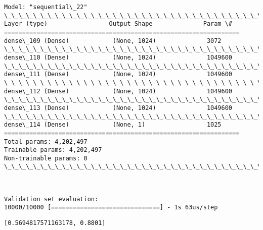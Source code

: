 \documentclass[11pt]{article}
\makeatletter
\newcommand{\boxspacing}{\kern\kvtcb@left@rule\kern\kvtcb@boxsep}
\newcommand{\prompt}[4]{
        \ttfamily\llap{{\color{#2}[#3]:\hspace{3pt}#4}}\vspace{-\baselineskip}
    }
\makeatother
\begin{document}
    \begin{Verbatim}[commandchars=\\\{\}]
Model: "sequential\_22"
\_\_\_\_\_\_\_\_\_\_\_\_\_\_\_\_\_\_\_\_\_\_\_\_\_\_\_\_\_\_\_\_\_\_\_\_\_\_\_\_\_\_\_\_\_\_\_\_\_\_\_\_\_\_\_\_\_\_\_\_\_\_\_\_\_
Layer (type)                 Output Shape              Param \#
=================================================================
dense\_109 (Dense)            (None, 1024)              3072
\_\_\_\_\_\_\_\_\_\_\_\_\_\_\_\_\_\_\_\_\_\_\_\_\_\_\_\_\_\_\_\_\_\_\_\_\_\_\_\_\_\_\_\_\_\_\_\_\_\_\_\_\_\_\_\_\_\_\_\_\_\_\_\_\_
dense\_110 (Dense)            (None, 1024)              1049600
\_\_\_\_\_\_\_\_\_\_\_\_\_\_\_\_\_\_\_\_\_\_\_\_\_\_\_\_\_\_\_\_\_\_\_\_\_\_\_\_\_\_\_\_\_\_\_\_\_\_\_\_\_\_\_\_\_\_\_\_\_\_\_\_\_
dense\_111 (Dense)            (None, 1024)              1049600
\_\_\_\_\_\_\_\_\_\_\_\_\_\_\_\_\_\_\_\_\_\_\_\_\_\_\_\_\_\_\_\_\_\_\_\_\_\_\_\_\_\_\_\_\_\_\_\_\_\_\_\_\_\_\_\_\_\_\_\_\_\_\_\_\_
dense\_112 (Dense)            (None, 1024)              1049600
\_\_\_\_\_\_\_\_\_\_\_\_\_\_\_\_\_\_\_\_\_\_\_\_\_\_\_\_\_\_\_\_\_\_\_\_\_\_\_\_\_\_\_\_\_\_\_\_\_\_\_\_\_\_\_\_\_\_\_\_\_\_\_\_\_
dense\_113 (Dense)            (None, 1024)              1049600
\_\_\_\_\_\_\_\_\_\_\_\_\_\_\_\_\_\_\_\_\_\_\_\_\_\_\_\_\_\_\_\_\_\_\_\_\_\_\_\_\_\_\_\_\_\_\_\_\_\_\_\_\_\_\_\_\_\_\_\_\_\_\_\_\_
dense\_114 (Dense)            (None, 1)                 1025
=================================================================
Total params: 4,202,497
Trainable params: 4,202,497
Non-trainable params: 0
\_\_\_\_\_\_\_\_\_\_\_\_\_\_\_\_\_\_\_\_\_\_\_\_\_\_\_\_\_\_\_\_\_\_\_\_\_\_\_\_\_\_\_\_\_\_\_\_\_\_\_\_\_\_\_\_\_\_\_\_\_\_\_\_\_
    \end{Verbatim}

    \begin{center}
    \end{center}
    { \hspace*{\fill} \\}
    
    \begin{Verbatim}[commandchars=\\\{\}]
Validation set evaluation:
10000/10000 [==============================] - 1s 63us/step
    \end{Verbatim}

            \begin{tcolorbox}[breakable, size=fbox, boxrule=.5pt, pad at break*=1mm, opacityfill=0]
\prompt{Out}{outcolor}{62}{\boxspacing}
\begin{Verbatim}[commandchars=\\\{\}]
[0.5694817571163178, 0.8801]
\end{Verbatim}
\end{tcolorbox}
        
\end{document}
